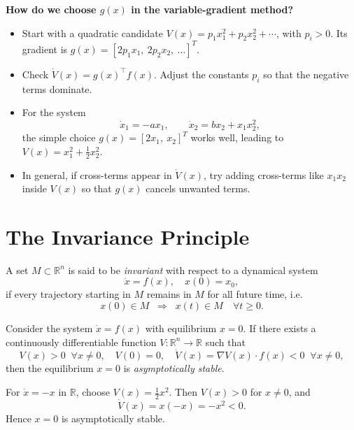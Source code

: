 \begin{remark}
\textbf{How do we choose $g(x)$ in the variable-gradient method?}

\begin{itemize}
  \item Start with a quadratic candidate $V(x)=p_1x_1^2+p_2x_2^2+\cdots$, with $p_i>0$.  
        Its gradient is $g(x)=[2p_1x_1,\ 2p_2x_2,\ \ldots]^T$.  

  \item Check $\dot V(x)=g(x)^\top f(x)$.  
        Adjust the constants $p_i$ so that the negative terms dominate.  

  \item For the system 
  \[
  \dot{x}_1=-a x_1,\qquad \dot{x}_2=b x_2+x_1x_2^2,
  \]
  the simple choice $g(x)=[2x_1,\ x_2]^T$ works well, leading to
  $V(x)=x_1^2+\tfrac12 x_2^2$.

  \item In general, if cross-terms appear in $\dot V(x)$, try adding cross-terms
  like $x_1x_2$ inside $V(x)$ so that $g(x)$ cancels unwanted terms.
\end{itemize}
\end{remark}

\section{The Invariance Principle}

\begin{definition}
A set $M \subset \mathbb{R}^n$ is said to be \emph{invariant} with respect to a dynamical system 
\[
\dot{x}=f(x), \quad x(0)=x_0,
\]
if every trajectory starting in $M$ remains in $M$ for all future time, i.e.
\[
x(0)\in M \;\;\Rightarrow\;\; x(t)\in M \quad \forall t\geq 0.
\]
\end{definition}


\begin{theorem}
Consider the system $\dot{x}=f(x)$ with equilibrium $x=0$.  
If there exists a continuously differentiable function $V:\mathbb{R}^n\to \mathbb{R}$ such that
\[
V(x)>0 \;\; \forall x\neq 0, \quad V(0)=0, \quad \dot V(x) = \nabla V(x)\cdot f(x) <0 \;\; \forall x\neq 0,
\]
then the equilibrium $x=0$ is \emph{asymptotically stable}.
\end{theorem}

\begin{example}
For $\dot{x}=-x$ in $\mathbb{R}$, choose $V(x)=\tfrac12 x^2$. Then $V(x)>0$ for $x\neq 0$, and
\[
\dot V(x) = x(-x) = -x^2 <0.
\]
Hence $x=0$ is asymptotically stable.
\end{example}

